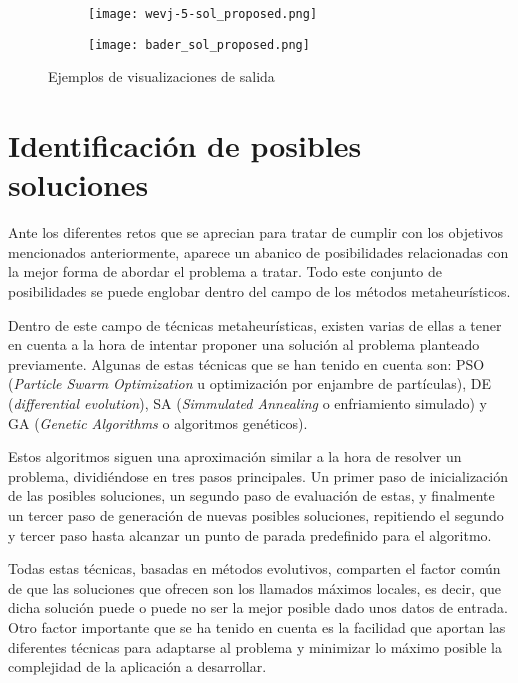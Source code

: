 \documentclass[11pt,spanish,listoffigures,listoftables]{tfgetsinf}
\begin{document}
\begin{figure}[!htb]
    \centering
    \begin{subfigure}[b]{0.95\linewidth}
    \texttt{[image: wevj-5-sol\_proposed.png]}
    \end{subfigure}
    \begin{subfigure}[b]{0.95\linewidth}
    \texttt{[image: bader\_sol\_proposed.png]}
    \end{subfigure}
    \caption{Ejemplos de visualizaciones de salida}
    \label{fig:other_solutions}
\end{figure}

\section{Identificación de posibles soluciones}
Ante los diferentes retos que se aprecian para tratar de cumplir con los objetivos mencionados anteriormente, aparece un abanico de posibilidades relacionadas con la mejor forma de abordar el problema a tratar. Todo este conjunto de posibilidades se puede englobar dentro del campo de los métodos metaheurísticos.

Dentro de este campo de técnicas metaheurísticas, existen varias de ellas a tener en cuenta a la hora de intentar proponer una solución al problema planteado previamente. Algunas de estas técnicas que se han tenido en cuenta son: PSO (\textit{Particle Swarm Optimization} u optimización por enjambre de partículas), DE (\textit{differential evolution}), SA (\textit{Simmulated Annealing} o enfriamiento simulado) y GA (\textit{Genetic Algorithms} o algoritmos genéticos).

Estos algoritmos siguen una aproximación similar a la hora de resolver un problema, dividiéndose en tres pasos principales. Un primer paso de inicialización de las posibles soluciones, un segundo paso de evaluación de estas, y finalmente un tercer paso de generación de nuevas posibles soluciones, repitiendo el segundo y tercer paso hasta alcanzar un punto de parada predefinido para el algoritmo.

Todas estas técnicas, basadas en métodos evolutivos, comparten el factor común de que las soluciones que ofrecen son los llamados máximos locales, es decir, que dicha solución puede o puede no ser la mejor posible dado unos datos de entrada. Otro factor importante que se ha tenido en cuenta es la facilidad que aportan las diferentes técnicas para adaptarse al problema y minimizar lo máximo posible la complejidad de la aplicación a desarrollar.
\end{document}
